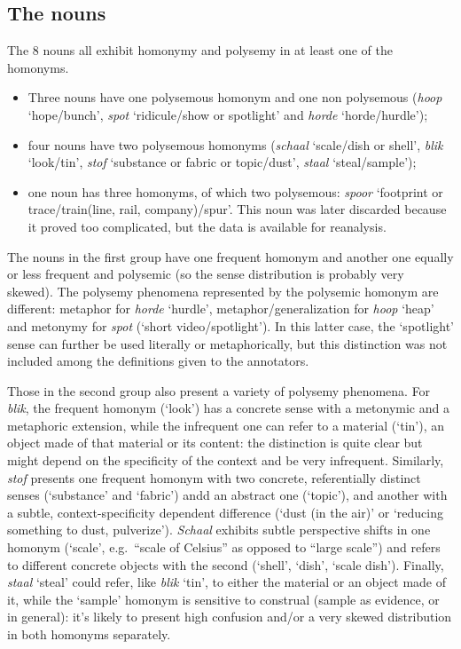 \documentclass[
]{book}
\begin{document}
\hypertarget{nouns}{%
\subsection{The nouns}\label{nouns}}

The 8 nouns all exhibit homonymy and polysemy in at least one of the homonyms.

\begin{itemize}
\item
  Three nouns have one polysemous homonym and one non polysemous (\emph{hoop} `hope/bunch', \emph{spot} `ridicule/show or spotlight' and \emph{horde} `horde/hurdle');
\item
  four nouns have two polysemous homonyms (\emph{schaal} `scale/dish or shell', \emph{blik} `look/tin', \emph{stof} `substance or fabric or topic/dust', \emph{staal} `steal/sample');
\item
  one noun has three homonyms, of which two polysemous: \emph{spoor} `footprint or trace/train(line, rail, company)/spur'. This noun was later discarded because it proved too complicated, but the data is available for reanalysis.
\end{itemize}

The nouns in the first group have one frequent homonym and another one equally or less frequent and polysemic (so the sense distribution is probably very skewed). The polysemy phenomena represented by the polysemic homonym are different: metaphor for \emph{horde} `hurdle', metaphor/generalization for \emph{hoop} `heap' and metonymy for \emph{spot} (`short video/spotlight'). In this latter case, the `spotlight' sense can further be used literally or metaphorically, but this distinction was not included among the definitions given to the annotators.

Those in the second group also present a variety of polysemy phenomena. For \emph{blik}, the frequent homonym (`look') has a concrete sense with a metonymic and a metaphoric extension, while the infrequent one can refer to a material (`tin'), an object made of that material or its content: the distinction is quite clear but might depend on the specificity of the context and be very infrequent.
Similarly, \emph{stof} presents one frequent homonym with two concrete, referentially distinct senses (`substance' and `fabric') andd an abstract one (`topic'), and another with a subtle, context-specificity dependent difference (`dust (in the air)' or `reducing something to dust, pulverize'). \emph{Schaal} exhibits subtle perspective shifts in one homonym (`scale', e.g.~``scale of Celsius'' as opposed to ``large scale'') and refers to different concrete objects with the second (`shell', `dish', `scale dish').
Finally, \emph{staal} `steal' could refer, like \emph{blik} `tin', to either the material or an object made of it, while the `sample' homonym is sensitive to construal (sample as evidence, or in general): it's likely to present high confusion and/or a very skewed distribution in both homonyms separately.
\end{document}
